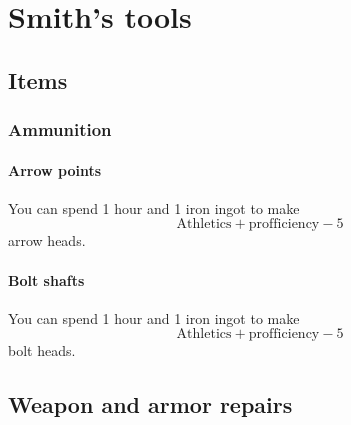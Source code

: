\chapter{Smith's tools}

\section{Items}

\subsection{Ammunition}

\subsubsection{Arrow points}

You can spend 1 hour and 1 iron ingot to make $$\mathrm{Athletics} + \mathrm{profficiency} - 5$$ arrow heads.

\subsubsection{Bolt shafts}

You can spend 1 hour and 1 iron ingot to make $$\mathrm{Athletics} + \mathrm{profficiency} - 5$$ bolt heads.

\section{Weapon and armor repairs}